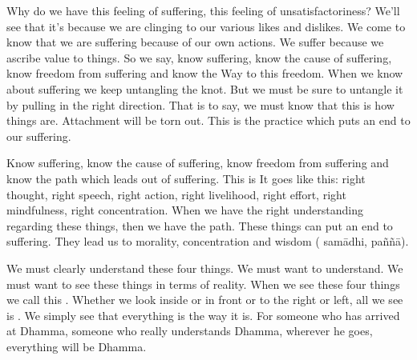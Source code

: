 Why do we have this feeling of suffering, this feeling of unsatisfactoriness? We'll see that it's because we are clinging to our various likes and dislikes. We come to know that we are suffering because of our own actions. We suffer because we ascribe value to things. So we say, know suffering, know the cause of suffering, know freedom from suffering and know the Way to this freedom. When we know about suffering we keep untangling the knot. But we must be sure to untangle it by pulling in the right \mbox{direction.} That is to say, we must know that this is how things are. Attachment will be torn out. This is the practice which puts an end to our suffering.

Know suffering, know the cause of suffering, know freedom from suffering and know the path which leads out of suffering. This is  It goes like this:  right thought, right speech, right action, right livelihood, right effort, right mindfulness, right concentration. When we have the right understanding regarding these things, then we have the path. These things can put an end to suffering. They lead us to morality, concentration and wisdom ( sam\=adhi, pa\~n\~n\=a).

We must clearly understand these four things. We must want to understand. We must want to see these things in terms of reality. When we see these four things we call this . Whether we look inside or in front or to the right or left, all we see is . We simply see that everything is the way it is. For someone who has arrived at Dhamma, someone who really understands Dhamma, wherever he goes, everything will be Dhamma.
